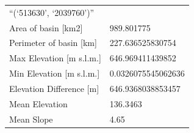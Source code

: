 \documentclass[11pt,]{article}
\begin{document}
\begin{longtable}[]{@{}ll@{}}
\begin{minipage}[t]{0.28\columnwidth}
``(`513630', `2039760')''\strut
\end{minipage}\tabularnewline
\begin{minipage}[t]{0.66\columnwidth}\raggedright\strut
Area of basin {[}km2{]}\strut
\end{minipage} & \begin{minipage}[t]{0.28\columnwidth}\raggedright\strut
989.801775\strut
\end{minipage}\tabularnewline
\begin{minipage}[t]{0.66\columnwidth}\raggedright\strut
Perimeter of basin {[}km{]}\strut
\end{minipage} & \begin{minipage}[t]{0.28\columnwidth}\raggedright\strut
227.636525830754\strut
\end{minipage}\tabularnewline
\begin{minipage}[t]{0.66\columnwidth}\raggedright\strut
Max Elevation {[}m s.l.m.{]}\strut
\end{minipage} & \begin{minipage}[t]{0.28\columnwidth}\raggedright\strut
646.969411439852\strut
\end{minipage}\tabularnewline
\begin{minipage}[t]{0.66\columnwidth}\raggedright\strut
Min Elevation {[}m s.l.m.{]}\strut
\end{minipage} & \begin{minipage}[t]{0.28\columnwidth}\raggedright\strut
0.0326075545062636\strut
\end{minipage}\tabularnewline
\begin{minipage}[t]{0.66\columnwidth}\raggedright\strut
Elevation Difference {[}m{]}\strut
\end{minipage} & \begin{minipage}[t]{0.28\columnwidth}\raggedright\strut
646.9368038853457\strut
\end{minipage}\tabularnewline
\begin{minipage}[t]{0.66\columnwidth}\raggedright\strut
Mean Elevation\strut
\end{minipage} & \begin{minipage}[t]{0.28\columnwidth}\raggedright\strut
136.3463\strut
\end{minipage}\tabularnewline
\begin{minipage}[t]{0.66\columnwidth}\raggedright\strut
Mean Slope\strut
\end{minipage} & \begin{minipage}[t]{0.28\columnwidth}\raggedright\strut
4.65\strut

\end{minipage}
\end{longtable}
\end{document}
